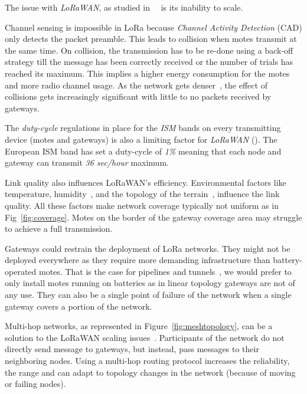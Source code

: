 

The issue with \emph{LoRaWAN}, as studied 
in~\cite{8030482}~\cite{10.1145/2988287.2989163} is its inability to scale. 

Channel sensing is impossible in LoRa because \emph{Channel Activity Detection}
(CAD) only detects the packet preamble. %
This leads to collision when motes transmit at the same time.
On collision, the transmission has to be re-done using a back-off strategy till the
message has been correctly received or the number of trials has reached its
maximum.
This implies a higher energy consumption for the motes and more radio 
channel usage.
As the network gets denser~\cite{8030482}, the effect of collisions gets
increasingly significant with little to no packets received by gateways.


The \emph{duty-cycle} regulations in place for the \emph{ISM} bands on every
transmitting device (motes and gateways) is also a limiting factor 
for \emph{LoRaWAN} (\cite{8030482}).
The European ISM band has set a duty-cycle of \emph{1\%} meaning that each node 
and gateway can transmit \emph{36 sec/hour} maximum. 


Link quality also influences LoRaWAN's efficiency. 
Environmental factors like temperature,
humidity~\cite{evaluation_of_the_reliability_of_lora}, and the topology of the
terrain~\cite{lorajambalaya}, influence the link quality.
All these factors make network coverage typically not uniform 
as in Fig~\ref{fig:coverage}.
Motes on the border of the gateway coverage area may struggle to
achieve a full transmission. 

Gateways could restrain the deployment of LoRa networks.
They might not be deployed everywhere as they require more demanding infrastructure 
than battery-operated motes.
That is the case for pipelines and tunnels~\cite{Abrardo_2019},
we would prefer to only install motes running on batteries as in linear
topology gateways are not of any use.
They can also be a single point of failure of the network when a single
gateway covers a portion of the network. 



Multi-hop networks, as represented in Figure~\ref{fig:meshtopology}, can be a solution to
the LoRaWAN scaling issues~\cite{8115756}.
Participants of the network do not directly send message to gateways, but
instead, pass messages to their neighboring nodes.
Using a multi-hop routing protocol increases the reliability, the range
and can adapt to topology changes in the network (because of moving or failing nodes).

